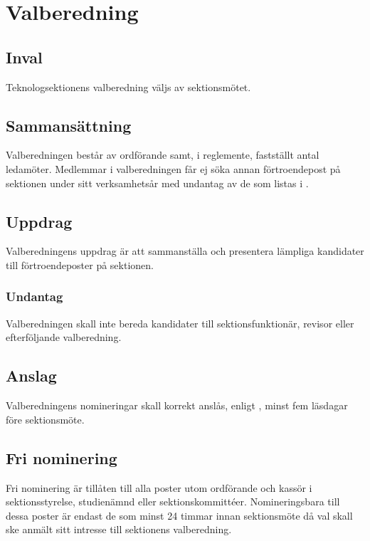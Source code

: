 \section{Valberedning}

\subsection{Inval}
Teknologsektionens valberedning väljs av sektionsmötet.

\subsection{Sammansättning}
Valberedningen består av ordförande samt, i reglemente, fastställt antal ledamöter. Medlemmar i valberedningen får ej söka annan förtroendepost på sektionen under sitt verksamhetsår med undantag av de som listas i .

\subsection{Uppdrag}
Valberedningens uppdrag är att sammanställa och presentera lämpliga kandidater till förtroendeposter på sektionen.

\subsubsection{Undantag}
\label{sec:valberedning:undantag}
Valberedningen skall inte bereda kandidater till sektionsfunktionär, revisor eller efterföljande valberedning.

\subsection{Anslag}
Valberedningens nomineringar skall korrekt anslås, enligt , minst fem läsdagar före sektionsmöte.

\subsection{Fri nominering}
Fri nominering är tillåten till alla poster utom ordförande och kassör i sektionsstyrelse, studienämnd eller sektionskommittéer. Nomineringsbara till dessa poster är endast de som minst 24 timmar innan sektionsmöte då val skall ske anmält sitt intresse till sektionens valberedning.
